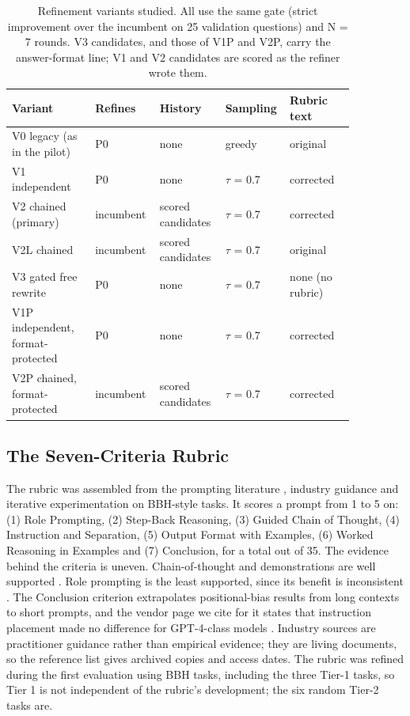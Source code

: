 \documentclass{ieeeaccess}
\begin{document}
\begin{table}[htbp]
\centering
\small
\caption{Refinement variants studied. All use the same gate (strict improvement over the incumbent on 25 validation questions) and N = 7 rounds. V3 candidates, and those of V1P and V2P, carry the answer-format line; V1 and V2 candidates are scored as the refiner wrote them.}
\begin{tabular}{>{\raggedright\arraybackslash}p{0.232\linewidth}>{\raggedright\arraybackslash}p{0.146\linewidth}>{\raggedright\arraybackslash}p{0.189\linewidth}>{\raggedright\arraybackslash}p{0.103\linewidth}>{\raggedright\arraybackslash}p{0.189\linewidth}}
\toprule
\textbf{Variant} & \textbf{Refines} & \textbf{History} & \textbf{Sampling} & \textbf{Rubric text} \\
\midrule
V0 legacy (as in the pilot) & P0 & none & greedy & original \\
V1 independent & P0 & none & $\tau$ = 0.7 & corrected \\
V2 chained (primary) & incumbent & scored candidates & $\tau$ = 0.7 & corrected \\
V2L chained & incumbent & scored candidates & $\tau$ = 0.7 & original \\
V3 gated free rewrite & P0 & none & $\tau$ = 0.7 & none (no rubric) \\
V1P independent, format-protected & P0 & none & $\tau$ = 0.7 & corrected \\
V2P chained, format-protected & incumbent & scored candidates & $\tau$ = 0.7 & corrected \\
\bottomrule
\end{tabular}
\end{table}

\subsection{The Seven-Criteria Rubric}

The rubric was assembled from the prompting literature \cite{schulhoff2024,sahoo2024}, industry guidance \cite{boonstra2025,anthropic2025,openai2025,microsoft2025} and iterative experimentation on BBH-style tasks. It scores a prompt from 1 to 5 on: (1) Role Prompting, (2) Step-Back Reasoning, (3) Guided Chain of Thought, (4) Instruction and Separation, (5) Output Format with Examples, (6) Worked Reasoning in Examples and (7) Conclusion, for a total out of 35. The evidence behind the criteria is uneven. Chain-of-thought and demonstrations are well supported \cite{wei2022,wang2023,min2022}. Role prompting is the least supported, since its benefit is inconsistent \cite{kim2024,zheng2024b}. The Conclusion criterion extrapolates positional-bias results from long contexts \cite{liu2024,yu2025} to short prompts, and the vendor page we cite for it states that instruction placement made no difference for GPT-4-class models \cite{microsoft2025}. Industry sources are practitioner guidance rather than empirical evidence; they are living documents, so the reference list gives archived copies and access dates. The rubric was refined during the first evaluation using BBH tasks, including the three Tier-1 tasks, so Tier 1 is not independent of the rubric's development; the six random Tier-2 tasks are.
\end{document}
